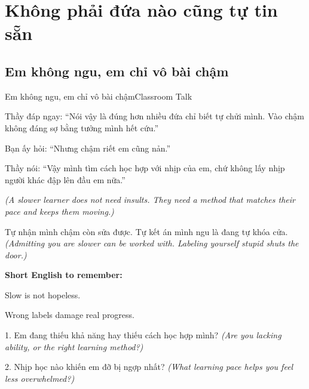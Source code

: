\chapter{Không phải đứa nào cũng tự tin sẵn}

\section{Em không ngu, em chỉ vô bài chậm}
\begin{truyen}{Em không ngu, em chỉ vô bài chậm}{Classroom Talk}

Thầy đáp ngay: ``Nói vậy là đúng hơn nhiều đứa chỉ biết tự chửi mình. Vào chậm không đáng sợ bằng tưởng mình hết cứu.''

Bạn ấy hỏi: ``Nhưng chậm riết em cũng nản.''

Thầy nói: ``Vậy mình tìm cách học hợp với nhịp của em, chứ không lấy nhịp người khác đập lên đầu em nữa.''

\textit{(A slower learner does not need insults. They need a method that matches their pace and keeps them moving.)}
\end{truyen}

\begin{baihoc}
Tự nhận mình chậm còn sửa được. Tự kết án mình ngu là đang tự khóa cửa.
\textit{(Admitting you are slower can be worked with. Labeling yourself stupid shuts the door.)}
\end{baihoc}

\begin{ghinhoanh}
\textbf{Short English to remember:}

Slow is not hopeless.

Wrong labels damage real progress.
\end{ghinhoanh}

\begin{tuhocnhanh}
1. Em đang thiếu khả năng hay thiếu cách học hợp mình? \textit{(Are you lacking ability, or the right learning method?)}

2. Nhịp học nào khiến em đỡ bị ngợp nhất? \textit{(What learning pace helps you feel less overwhelmed?)}
\end{tuhocnhanh}
\ngancach

